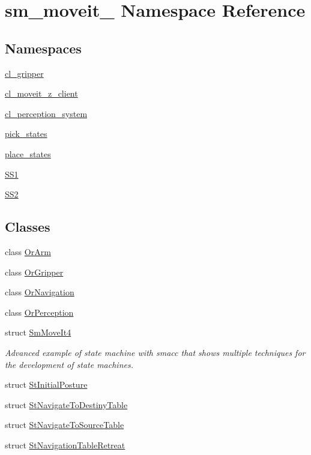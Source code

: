 \hypertarget{namespacesm__moveit__4}{}\section{sm\+\_\+moveit\+\_ Namespace Reference}
\label{namespacesm__moveit__4}
\subsection*{Namespaces}
\begin{DoxyCompactItemize}
\item 
 \hyperlink{namespacesm__moveit__4_1_1cl__gripper}{cl\+\_\+gripper}
\item 
 \hyperlink{namespacesm__moveit__4_1_1cl__moveit__z__client}{cl\+\_\+moveit\+\_\+z\+\_\+client}
\item 
 \hyperlink{namespacesm__moveit__4_1_1cl__perception__system}{cl\+\_\+perception\+\_\+system}
\item 
 \hyperlink{namespacesm__moveit__4_1_1pick__states}{pick\+\_\+states}
\item 
 \hyperlink{namespacesm__moveit__4_1_1place__states}{place\+\_\+states}
\item 
 \hyperlink{namespacesm__moveit__4_1_1SS1}{S\+S1}
\item 
 \hyperlink{namespacesm__moveit__4_1_1SS2}{S\+S2}
\end{DoxyCompactItemize}
\subsection*{Classes}
\begin{DoxyCompactItemize}
\item 
class \hyperlink{classsm__moveit__4_1_1OrArm}{Or\+Arm}
\item 
class \hyperlink{classsm__moveit__4_1_1OrGripper}{Or\+Gripper}
\item 
class \hyperlink{classsm__moveit__4_1_1OrNavigation}{Or\+Navigation}
\item 
class \hyperlink{classsm__moveit__4_1_1OrPerception}{Or\+Perception}
\item 
struct \hyperlink{structsm__moveit__4_1_1SmMoveIt4}{Sm\+Move\+It4}
\begin{DoxyCompactList}\small\item\em Advanced example of state machine with smacc that shows multiple techniques for the development of state machines. \end{DoxyCompactList}\item 
struct \hyperlink{structsm__moveit__4_1_1StInitialPosture}{St\+Initial\+Posture}
\item 
struct \hyperlink{structsm__moveit__4_1_1StNavigateToDestinyTable}{St\+Navigate\+To\+Destiny\+Table}
\item 
struct \hyperlink{structsm__moveit__4_1_1StNavigateToSourceTable}{St\+Navigate\+To\+Source\+Table}
\item 
struct \hyperlink{structsm__moveit__4_1_1StNavigationTableRetreat}{St\+Navigation\+Table\+Retreat}
\end{DoxyCompactItemize}
